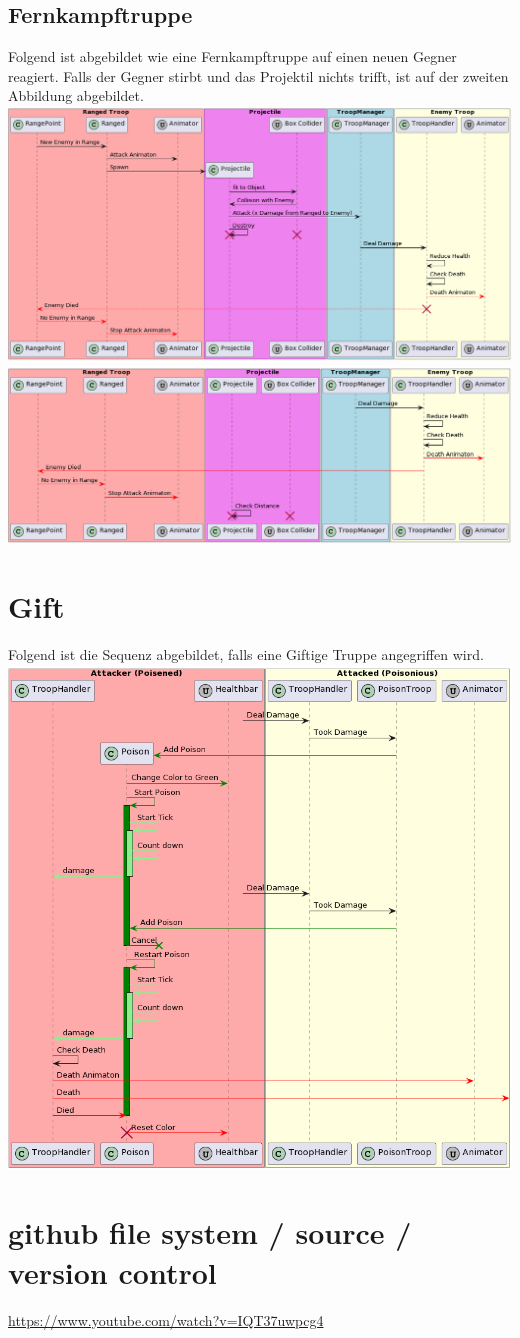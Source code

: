 \subsection{Fernkampftruppe}
Folgend ist abgebildet wie eine Fernkampftruppe auf einen neuen Gegner reagiert.
Falls der Gegner stirbt und das Projektil nichts trifft, ist auf der zweiten Abbildung abgebildet.
\includegraphics[width=15cm]{resources/RangedAttacks.png} \\
\includegraphics[width=15cm]{resources/Projectile.png}

\section{Gift}
Folgend ist die Sequenz abgebildet, falls eine Giftige Truppe angegriffen wird. \\
\includegraphics[width=15cm]{resources/Poison.png} \\


\section*{github file system / source / version control}
\url{https://www.youtube.com/watch?v=IQT37uwpcg4}